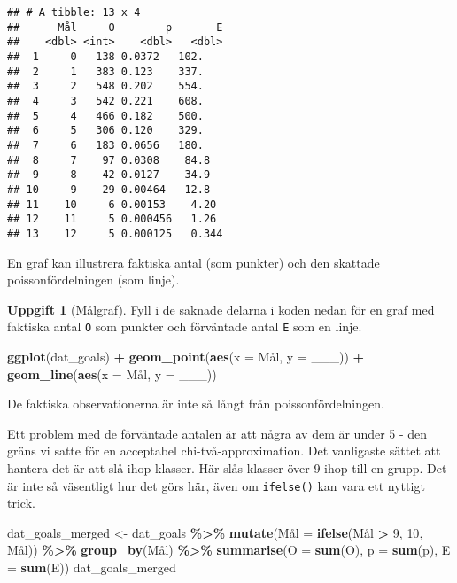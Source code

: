 \documentclass[
]{book}
\newenvironment{Shaded}{\begin{snugshade}}{\end{snugshade}}
\newcommand{\AttributeTok}[1]{\textcolor[rgb]{0.13,0.29,0.53}{#1}}
\newcommand{\DecValTok}[1]{\textcolor[rgb]{0.00,0.00,0.81}{#1}}
\newcommand{\FunctionTok}[1]{\textcolor[rgb]{0.13,0.29,0.53}{\textbf{#1}}}
\newcommand{\NormalTok}[1]{#1}
\newcommand{\OtherTok}[1]{\textcolor[rgb]{0.56,0.35,0.01}{#1}}
\newcommand{\SpecialCharTok}[1]{\textcolor[rgb]{0.81,0.36,0.00}{\textbf{#1}}}
\theoremstyle{definition}
\theoremstyle{definition}
\theoremstyle{definition}
\newtheorem{exercise}{Uppgift}[chapter]
\theoremstyle{definition}
\theoremstyle{remark}
\begin{document}
\begin{verbatim}
## # A tibble: 13 x 4
##      Mål     O        p       E
##    <dbl> <int>    <dbl>   <dbl>
##  1     0   138 0.0372   102.   
##  2     1   383 0.123    337.   
##  3     2   548 0.202    554.   
##  4     3   542 0.221    608.   
##  5     4   466 0.182    500.   
##  6     5   306 0.120    329.   
##  7     6   183 0.0656   180.   
##  8     7    97 0.0308    84.8  
##  9     8    42 0.0127    34.9  
## 10     9    29 0.00464   12.8  
## 11    10     6 0.00153    4.20 
## 12    11     5 0.000456   1.26 
## 13    12     5 0.000125   0.344
\end{verbatim}

En graf kan illustrera faktiska antal (som punkter) och den skattade poissonfördelningen (som linje).

\begin{exercise}[Målgraf]

Fyll i de saknade delarna i koden nedan för en graf med faktiska antal \texttt{O} som punkter och förväntade antal \texttt{E} som en linje.

\begin{Shaded}
\begin{Highlighting}[]
\FunctionTok{ggplot}\NormalTok{(dat\_goals) }\SpecialCharTok{+}
  \FunctionTok{geom\_point}\NormalTok{(}\FunctionTok{aes}\NormalTok{(}\AttributeTok{x =}\NormalTok{ Mål, }\AttributeTok{y =}\NormalTok{ \_\_\_)) }\SpecialCharTok{+}
  \FunctionTok{geom\_line}\NormalTok{(}\FunctionTok{aes}\NormalTok{(}\AttributeTok{x =}\NormalTok{ Mål, }\AttributeTok{y =}\NormalTok{ \_\_\_))}
\end{Highlighting}
\end{Shaded}

\end{exercise}

De faktiska observationerna är inte så långt från poissonfördelningen.

Ett problem med de förväntade antalen är att några av dem är under 5 - den gräns vi satte för en acceptabel chi-två-approximation. Det vanligaste sättet att hantera det är att slå ihop klasser. Här slås klasser över 9 ihop till en grupp. Det är inte så väsentligt hur det görs här, även om \texttt{ifelse()} kan vara ett nyttigt trick.

\begin{Shaded}
\begin{Highlighting}[]
\NormalTok{dat\_goals\_merged }\OtherTok{\textless{}{-}}\NormalTok{ dat\_goals }\SpecialCharTok{\%\textgreater{}\%} 
  \FunctionTok{mutate}\NormalTok{(Mål }\OtherTok{=} \FunctionTok{ifelse}\NormalTok{(Mål }\SpecialCharTok{\textgreater{}} \DecValTok{9}\NormalTok{, }\DecValTok{10}\NormalTok{, Mål)) }\SpecialCharTok{\%\textgreater{}\%} 
  \FunctionTok{group\_by}\NormalTok{(Mål) }\SpecialCharTok{\%\textgreater{}\%} 
  \FunctionTok{summarise}\NormalTok{(}\AttributeTok{O =} \FunctionTok{sum}\NormalTok{(O),}
            \AttributeTok{p =} \FunctionTok{sum}\NormalTok{(p),}
            \AttributeTok{E =} \FunctionTok{sum}\NormalTok{(E))}
\NormalTok{dat\_goals\_merged}
\end{Highlighting}
\end{Shaded}
\end{document}
